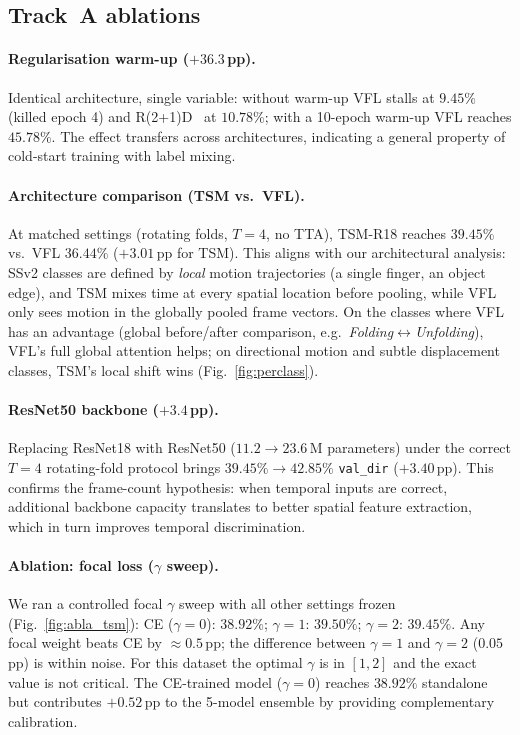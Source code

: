\documentclass[10pt,twocolumn,letterpaper]{article}
\begin{document}
\subsection{Track~A ablations}

\paragraph{Regularisation warm-up ($+36.3$\,pp).}
Identical architecture, single variable: without warm-up VFL stalls at $9.45\%$
(killed epoch 4) and R(2+1)D~\cite{tran2018r2plus1d} at $10.78\%$; with a
10-epoch warm-up VFL reaches $45.78\%$. The effect transfers across architectures,
indicating a general property of cold-start training with label mixing.

\paragraph{Architecture comparison (TSM vs.\ VFL).}
At matched settings (rotating folds, $T{=}4$, no TTA), TSM-R18 reaches
$39.45\%$ vs.\ VFL $36.44\%$ ($+3.01$\,pp for TSM). This aligns with our
architectural analysis: SSv2 classes are defined by \emph{local} motion
trajectories (a single finger, an object edge), and TSM mixes time at every
spatial location before pooling, while VFL only sees motion in the globally
pooled frame vectors. On the classes where VFL has an advantage (global
before/after comparison, e.g.\ \emph{Folding}$\leftrightarrow$\emph{Unfolding}),
VFL's full global attention helps; on directional motion and subtle displacement
classes, TSM's local shift wins (Fig.~\ref{fig:perclass}).

\paragraph{ResNet50 backbone ($+3.4$\,pp).}
Replacing ResNet18 with ResNet50 ($11.2\!\rightarrow\!23.6$\,M parameters)
under the correct $T{=}4$ rotating-fold protocol brings
$39.45\%\!\rightarrow\!42.85\%$ \texttt{val\_dir} ($+3.40$\,pp).
This confirms the frame-count hypothesis: when temporal inputs are correct,
additional backbone capacity translates to better spatial feature extraction,
which in turn improves temporal discrimination.

\paragraph{Ablation: focal loss ($\gamma$ sweep).}
We ran a controlled focal $\gamma$ sweep with all other settings frozen
(Fig.~\ref{fig:abla_tsm}):
CE ($\gamma{=}0$): $38.92\%$; $\gamma{=}1$: $39.50\%$; $\gamma{=}2$: $39.45\%$.
Any focal weight beats CE by ${\approx}0.5$\,pp; the difference between
$\gamma{=}1$ and $\gamma{=}2$ ($0.05$\,pp) is within noise. For this dataset
the optimal $\gamma$ is in $[1, 2]$ and the exact value is not critical.
The CE-trained model ($\gamma{=}0$) reaches $38.92\%$ standalone but contributes
$+0.52$\,pp to the 5-model ensemble by providing complementary calibration.
\end{document}
